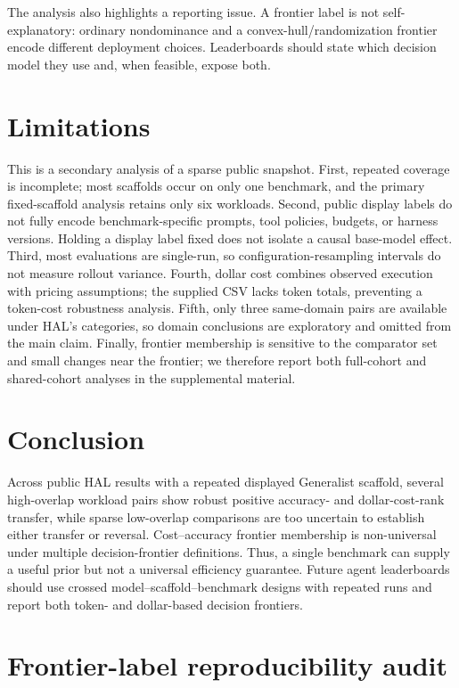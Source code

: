 \documentclass{article}
\begin{document}
The analysis also highlights a reporting issue. A frontier label is not self-explanatory: ordinary nondominance and a convex-hull/randomization frontier encode different deployment choices. Leaderboards should state which decision model they use and, when feasible, expose both.

\section{Limitations}

This is a secondary analysis of a sparse public snapshot. First, repeated coverage is incomplete; most scaffolds occur on only one benchmark, and the primary fixed-scaffold analysis retains only six workloads. Second, public display labels do not fully encode benchmark-specific prompts, tool policies, budgets, or harness versions. Holding a display label fixed does not isolate a causal base-model effect. Third, most evaluations are single-run, so configuration-resampling intervals do not measure rollout variance. Fourth, dollar cost combines observed execution with pricing assumptions; the supplied CSV lacks token totals, preventing a token-cost robustness analysis. Fifth, only three same-domain pairs are available under HAL's categories, so domain conclusions are exploratory and omitted from the main claim. Finally, frontier membership is sensitive to the comparator set and small changes near the frontier; we therefore report both full-cohort and shared-cohort analyses in the supplemental material.

\section{Conclusion}

Across public HAL results with a repeated displayed Generalist scaffold, several high-overlap workload pairs show robust positive accuracy- and dollar-cost-rank transfer, while sparse low-overlap comparisons are too uncertain to establish either transfer or reversal. Cost--accuracy frontier membership is non-universal under multiple decision-frontier definitions. Thus, a single benchmark can supply a useful prior but not a universal efficiency guarantee. Future agent leaderboards should use crossed model--scaffold--benchmark designs with repeated runs and report both token- and dollar-based decision frontiers.




\clearpage
\section{Frontier-label reproducibility audit}
\label{app:pareto}
\begin{table}[h]
\caption{Supplied HAL frontier labels compared with reconstructed frontiers by benchmark. Agreement is the fraction of displayed rows with identical Boolean labels.}
\centering
\scriptsize

\end{table}
\end{document}
